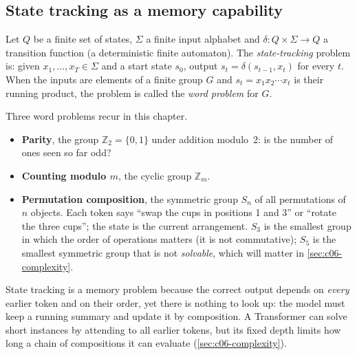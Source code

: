 \subsection{State tracking as a memory capability}\label{sec:c06-state-tracking}

\begin{definition}\label{def:c06-tracking}
Let $Q$ be a finite set of states, $\Sigma$ a finite input alphabet and
$\delta:Q\times\Sigma\to Q$ a transition function (a deterministic finite automaton). The
\emph{state-tracking} problem is: given $x_1,\dots,x_T\in\Sigma$ and a start state $s_0$,
output $s_t=\delta(s_{t-1},x_t)$ for every $t$. When the inputs are elements of a finite
group $G$ and $s_t=x_1x_2\cdots x_t$ is their running product, the problem is called the
\emph{word problem} for $G$.
\end{definition}

Three word problems recur in this chapter.
\begin{itemize}
\item \textbf{Parity}, the group $\mathbb{Z}_2=\{0,1\}$ under addition modulo~2: is the
number of ones seen so far odd?
\item \textbf{Counting modulo $m$}, the cyclic group $\mathbb{Z}_m$.
\item \textbf{Permutation composition}, the symmetric group $S_n$ of all permutations of
$n$ objects. Each token says ``swap the cups in positions 1 and 3'' or ``rotate the three
cups''; the state is the current arrangement. $S_3$ is the smallest group in which the
order of operations matters (it is not commutative); $S_5$ is the smallest symmetric group
that is not \emph{solvable}, which will matter in \cref{sec:c06-complexity}.
\end{itemize}
State tracking is a memory problem because the correct output depends on \emph{every}
earlier token and on their order, yet there is nothing to look up: the model must keep a
running summary and update it by composition. A Transformer can solve short instances by
attending to all earlier tokens, but its fixed depth limits how long a chain of
compositions it can evaluate (\cref{sec:c06-complexity}).

